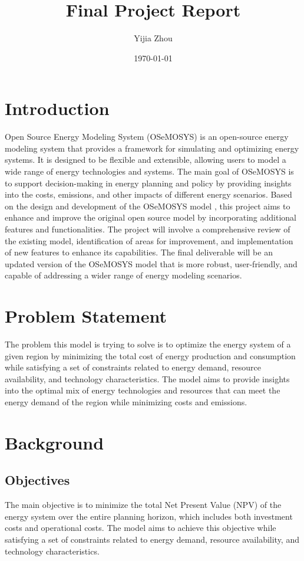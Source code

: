 \documentclass[11pt]{article}
\title{Final Project Report}
\author{Yijia Zhou}
\date{\today}
\begin{document}
\maketitle


\section{Introduction}
Open Source Energy Modeling System (OSeMOSYS) is an open-source energy modeling system that provides a framework for simulating and optimizing energy systems. It is designed to be flexible and extensible, allowing users to model a wide range of energy technologies and systems. The main goal of OSeMOSYS is to support decision-making in energy planning and policy by providing insights into the costs, emissions, and other impacts of different energy scenarios. Based on the design and development of the OSeMOSYS model \cite{Howells2011}, this project aims to enhance and improve the original open source model by incorporating additional features and functionalities. The project will involve a comprehensive review of the existing model, identification of areas for improvement, and implementation of new features to enhance its capabilities. The final deliverable will be an updated version of the OSeMOSYS model that is more robust, user-friendly, and capable of addressing a wider range of energy modeling scenarios.

\section{Problem Statement}
The problem this model is trying to solve is to optimize the energy system of a given region by minimizing the total cost of energy production and consumption while satisfying a set of constraints related to energy demand, resource availability, and technology characteristics. The model aims to provide insights into the optimal mix of energy technologies and resources that can meet the energy demand of the region while minimizing costs and emissions. 

\section{Background}
\subsection{Objectives}
The main objective is to minimize the total Net Present Value (NPV) of the energy system over the entire planning horizon, which includes both investment costs and operational costs. The model aims to achieve this objective while satisfying a set of constraints related to energy demand, resource availability, and technology characteristics.
\end{document}
